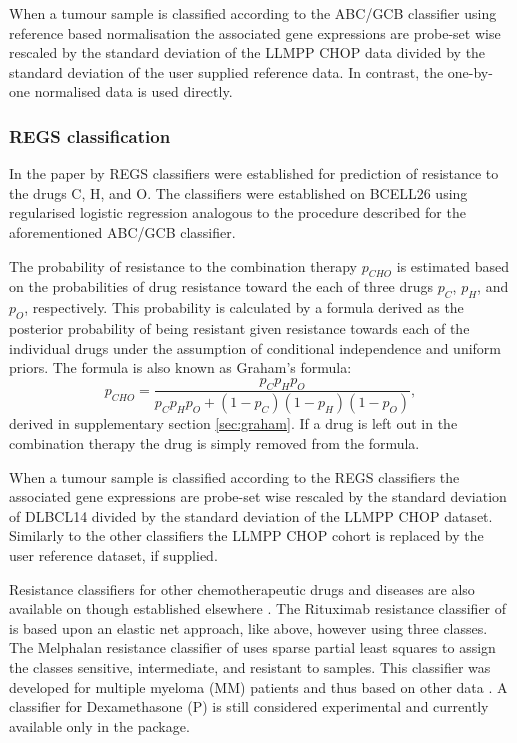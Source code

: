 \documentclass{article}
\begin{document}
When a tumour sample is classified according to the ABC/GCB classifier using reference based normalisation the associated gene expressions are probe-set wise rescaled by the standard deviation of the LLMPP CHOP data divided by the standard deviation of the user supplied reference data.
In contrast, the one-by-one normalised data is used directly.

\subsubsection{REGS classification}
\label{sec:regsmethods}
In the paper by \citet{Falgreen2015} REGS classifiers were established for prediction of resistance to the drugs C, H, and O.
The classifiers were established on BCELL26 using regularised logistic regression analogous to the procedure described for the aforementioned ABC/GCB classifier.

The probability of resistance to the combination therapy $p_{CHO}$ is estimated based on the probabilities of drug resistance toward the each of three drugs $p_C$, $p_H$, and $p_O$, respectively.
This probability is calculated by a formula derived as the posterior probability of being resistant given resistance towards each of the individual drugs under the assumption of conditional independence and uniform priors.
The formula is also known as Graham's formula:
\begin{equation*}
  p_{CHO} = \frac{p_C p_H p_O}{p_C p_H p_O + (1 - p_C)(1 - p_H)(1 - p_O)},
\end{equation*}
derived in supplementary section \ref{sec:graham}.
If a drug is left out in the combination therapy the drug is simply removed from the formula.

When a tumour sample is classified according to the REGS classifiers the associated gene expressions are probe-set wise rescaled by the standard deviation of DLBCL14 divided by the standard deviation of the LLMPP CHOP dataset.
Similarly to the other classifiers the LLMPP CHOP cohort is replaced by the user reference dataset, if supplied.

Resistance classifiers for other chemotherapeutic drugs and diseases are also available on \hemaClass{} though established elsewhere \citep{Boegsted2011,Bogsted2013,Laursen2014}.
The Rituximab resistance classifier of \citet{Laursen2014} is based upon an elastic net approach, like above, however using three classes.
The Melphalan resistance classifier of \citet{Boegsted2011} uses sparse partial least squares to assign the classes sensitive, intermediate, and resistant to samples.
This classifier was developed for multiple myeloma (MM) patients and thus based on other data \citep{Boegsted2011}.
A classifier for Dexamethasone (P) is still considered experimental and currently available only in the package.
\end{document}
